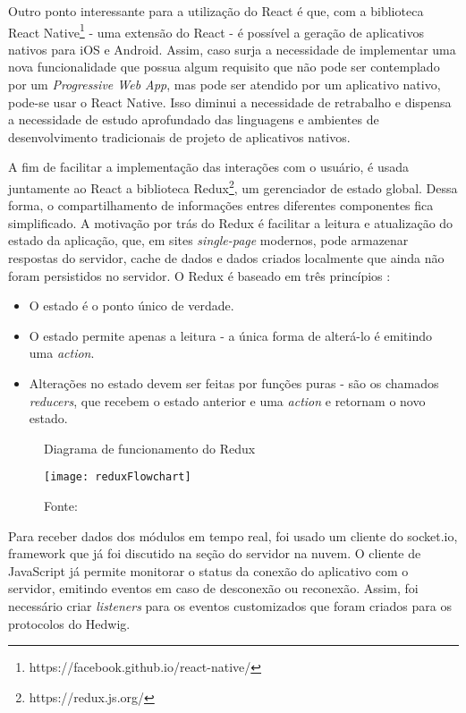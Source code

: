 Outro ponto interessante para a utilização do React é que, com a biblioteca React Native\footnote{https://facebook.github.io/react-native/} - uma extensão do React - é possível a geração de aplicativos nativos para iOS e Android. Assim, caso surja a necessidade de implementar uma nova funcionalidade que possua algum requisito que não pode ser contemplado por um \textit{Progressive Web App}, mas pode ser atendido por um aplicativo nativo, pode-se usar o React Native. Isso diminui a necessidade de retrabalho e dispensa a necessidade de estudo aprofundado das linguagens e ambientes de desenvolvimento tradicionais de projeto de aplicativos nativos.

A fim de facilitar a implementação das interações com o usuário, é usada juntamente ao React a biblioteca Redux\footnote{https://redux.js.org/}, um gerenciador de estado global. Dessa forma, o compartilhamento de informações entres diferentes componentes fica simplificado. A motivação por trás do Redux é facilitar a leitura e atualização do estado da aplicação, que, em sites \textit{single-page} modernos, pode armazenar respostas do servidor, cache de dados e dados criados localmente que ainda não foram persistidos no servidor. O Redux é baseado em três princípios \cite{redux}:

\begin{itemize}
\item O estado é o ponto único de verdade.
\item O estado permite apenas a leitura - a única forma de alterá-lo é emitindo uma \textit{action}.
\item Alterações no estado devem ser feitas por funções puras - são os chamados \textit{reducers}, que recebem o estado anterior e uma \textit{action} e retornam o novo estado.
\end{itemize}

\begin{figure}
	\centering
	\caption{Diagrama de funcionamento do Redux}
  \texttt{[image: reduxFlowchart]}
  \caption*{Fonte: \cite{reduxdataflow}}
\label{fig:reduxFlowchart}
\end{figure}

Para receber dados dos módulos em tempo real, foi usado um cliente do socket.io, framework que já foi discutido na seção do servidor na nuvem. O cliente de JavaScript já permite monitorar o status da conexão do aplicativo com o servidor, emitindo eventos em caso de desconexão ou reconexão. Assim, foi necessário criar \textit{listeners} para os eventos customizados que foram criados para os protocolos do Hedwig.

